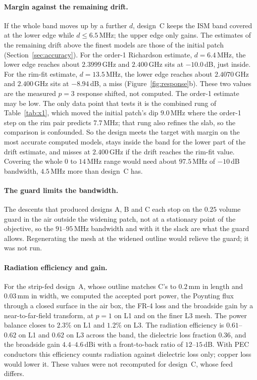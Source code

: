 \documentclass{anvil-paper}
\begin{document}
\paragraph{Margin against the remaining drift.}
If the whole band moves up by a further $d$, design~C keeps the ISM band
covered at the lower edge while $d \le 6.5$\,MHz; the upper edge only gains.
The estimates of the remaining drift above the finest models are those of
the initial patch (Section~\ref{sec:accuracy}). For the order-1 Richardson
estimate, $d = 6.4$\,MHz, the lower edge reaches about $2.3999$\,GHz and
$2.400$\,GHz sits at $-10.0$\,dB, just inside. For the rim-fit estimate,
$d = 13.5$\,MHz, the lower edge reaches about $2.4070$\,GHz and
$2.400$\,GHz sits at $-8.94$\,dB, a miss (Figure~\ref{fig:response}b).
These two values are the measured $p = 3$ response shifted, not computed.
The order-1 estimate may be low. The only data point that tests it is the
combined rung of Table~\ref{tab:x1}, which moved the initial patch's dip
$9.0$\,MHz where the order-1 step on the rim pair predicts $7.7$\,MHz; that
rung also refines the slab, so the comparison is confounded.
So the design meets the target with margin on the most accurate computed
models, stays inside the band for the lower part of the drift estimate, and
misses at $2.400$\,GHz if the drift reaches the rim-fit value. Covering the
whole $0$ to $14$\,MHz range would need about $97.5$\,MHz of $-10$\,dB
bandwidth, $4.5$\,MHz more than design~C has.

\paragraph{The guard limits the bandwidth.}
The descents that produced designs A, B and C each stop on the $0.25$
volume guard in the air outside the widening patch, not at a stationary point of the objective, so
the $91$--$95$\,MHz bandwidth and with it the slack are what the guard
allows. Regenerating the mesh at the widened outline would relieve the
guard; it was not run.

\paragraph{Radiation efficiency and gain.}
For the strip-fed design~A, whose outline matches C's to $0.2$\,mm in length
and $0.03$\,mm in width, we computed the accepted port power, the Poynting
flux through a closed surface in the air box, the FR-4 loss and the
broadside gain by a near-to-far-field transform, at $p = 1$ on L1 and on the
finer L3 mesh. The power balance closes to $2.3\%$ on L1 and $1.2\%$ on L3.
The radiation efficiency is $0.61$--$0.62$ on L1 and $0.62$ on L3 across the
band, the dielectric loss fraction $0.36$, and the broadside gain
$4.4$--$4.6$\,dBi with a front-to-back ratio of $12$--$15$\,dB. With PEC
conductors this efficiency counts radiation against dielectric loss only;
copper loss would lower it. These values were not recomputed for
design~C, whose feed differs.
\end{document}
